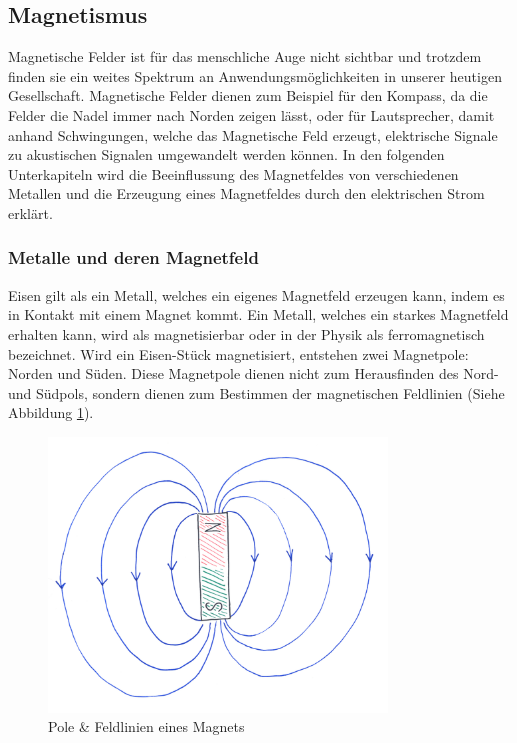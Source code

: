 \subsection{Magnetismus}\label{cap:einlesung_magnetismus}
Magnetische Felder ist für das menschliche Auge nicht sichtbar und trotzdem finden sie ein weites Spektrum an Anwendungsmöglichkeiten in unserer heutigen Gesellschaft. Magnetische Felder dienen zum Beispiel für den Kompass, da die Felder die Nadel immer nach Norden zeigen lässt, oder für Lautsprecher, damit anhand Schwingungen, welche das Magnetische Feld erzeugt, elektrische Signale zu akustischen Signalen umgewandelt werden können.
\newpara
In den folgenden Unterkapiteln wird die Beeinflussung des Magnetfeldes von verschiedenen Metallen und die Erzeugung eines Magnetfeldes durch den elektrischen Strom erklärt.
\subsubsection{Metalle und deren Magnetfeld}
Eisen gilt als ein Metall, welches ein eigenes Magnetfeld erzeugen kann, indem es in Kontakt mit einem Magnet kommt. Ein Metall, welches ein starkes Magnetfeld erhalten kann, wird als magnetisierbar oder in der Physik als ferromagnetisch bezeichnet.
\newpara
Wird ein Eisen-Stück magnetisiert, entstehen zwei Magnetpole: Norden und Süden. Diese Magnetpole dienen nicht zum Herausfinden des Nord- und Südpols, sondern dienen zum Bestimmen der magnetischen Feldlinien (Siehe Abbildung \ref{fig:magnetismus_polarisation_feldlinien}).
\begin{figure}[ht]
  \begin{center}
    \includegraphics[width=9cm]{assets/images/magnetismus/magnet}
  \end{center}
  \vspace{-3ex}
  \caption{Pole \& Feldlinien eines Magnets}
  \label{fig:magnetismus_polarisation_feldlinien}
\end{figure}

